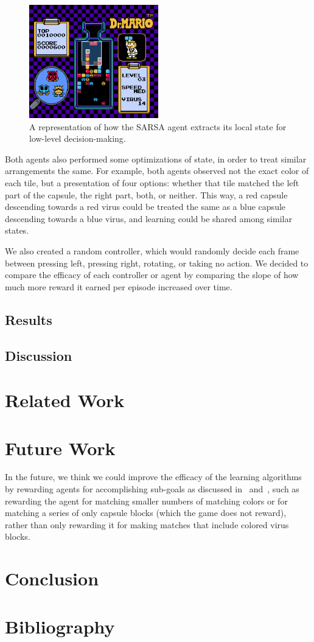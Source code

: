 \documentclass[letterpaper]{article} %
\begin{document}
\begin{figure}
\includegraphics[width=0.5\textwidth]{local-state.png}
\caption{A representation of how the SARSA agent extracts its local state for low-level decision-making.}\label{fig:local-state}
\end{figure}

Both agents also performed some optimizations of state, in order to treat similar arrangements the same. For example, both agents observed not the exact color of each tile, but a presentation of four options: whether that tile matched the left part of the capsule, the right part, both, or neither. This way, a red capsule descending towards a red virus could be treated the same as a blue capsule descending towards a blue virus, and learning could be shared among similar states.

We also created a random controller, which would randomly decide each frame between pressing left, pressing right, rotating, or taking no action. We decided to compare the efficacy of each controller or agent by comparing the slope of how much more reward it earned per episode increased over time.

\subsection{Results}


\subsection{Discussion}

\section{Related Work}

\section{Future Work}
In the future, we think we could improve the efficacy of the learning algorithms by rewarding agents for accomplishing sub-goals as discussed in~\cite{banzas15} and~\cite{bhonker17}, such as rewarding the agent for matching smaller numbers of matching colors or for matching a series of only capsule blocks (which the game does not reward), rather than only rewarding it for making matches that include colored virus blocks.

\section{Conclusion}

\newpage
\section{Bibliography}


\end{document}
